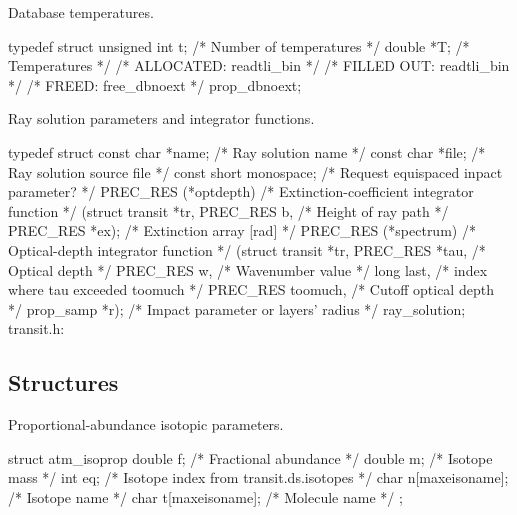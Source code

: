 \documentclass[letterpaper,12pt]{article}
\begin{document}
\noindent \newline
Database temperatures.
\begin{plain}
typedef struct {    
  unsigned int t;   /* Number of temperatures				    */
  double *T;        /* Temperatures                                         */
    /* ALLOCATED:	readtli_bin					    */
    /* FILLED OUT:	readtli_bin					    */
    /* FREED: 		free_dbnoext					    */
} prop_dbnoext;
\end{plain}

\noindent \newline
Ray solution parameters and integrator functions.
\begin{plain}
typedef struct {
  const char *name;          /* Ray solution name                           */
  const char *file;          /* Ray solution source file                    */
  const short monospace;     /* Request equispaced inpact parameter?        */
  PREC_RES (*optdepth)       /* Extinction-coefficient integrator function  */
       (struct transit *tr,
        PREC_RES b,              /* Height of ray path                      */
        PREC_RES *ex);           /* Extinction array [rad]                  */
  PREC_RES (*spectrum)       /* Optical-depth integrator function           */
        (struct transit *tr,
         PREC_RES *tau,          /* Optical depth                           */
         PREC_RES w,             /* Wavenumber value                        */
         long last,              /* index where tau exceeded toomuch        */
         PREC_RES toomuch,       /* Cutoff optical depth                    */
         prop_samp *r);          /* Impact parameter or layers' radius      */
} ray_solution;	transit.h:
\end{plain}


\subsection{Structures}

Proportional-abundance isotopic parameters.
\begin{plain}
struct atm_isoprop{
  double f;            /* Fractional abundance                        */
  double m;            /* Isotope mass                                */
  int eq;              /* Isotope index from transit.ds.isotopes      */
  char n[maxeisoname]; /* Isotope name                                */
  char t[maxeisoname]; /* Molecule name                               */
};
\end{plain}
\end{document}
